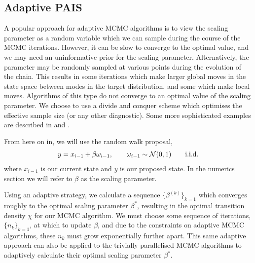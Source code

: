 \documentclass[final]{siamltex}
\begin{document}
\subsection{Adaptive PAIS}\label{sec:adapt}

A popular approach for adaptive MCMC algorithms is to view the scaling
parameter as a random variable which we can sample during the course
of the MCMC iterations. However, it can be slow to converge to the
optimal value, and we may need an
uninformative prior for the scaling parameter. Alternatively, the
parameter may be randomly sampled at various points during the
evolution of the chain. This results in some iterations which make
larger global moves in the state space between modes in the target
distribution, and some which make local moves. Algorithms of this type
do not converge to an optimal value of the scaling parameter. We choose to use a divide and conquer scheme which optimises the
effective sample size (or any other diagnostic). Some more
sophisticated examples are described in \cite{roberts2009examples} and
\cite{Ji2013adaptive}. 

From here on in, we will use the random walk proposal,
\begin{equation}y = x_{i-1}+\beta \omega_{i-1}, \qquad \omega_{i-1}
  \sim \mathcal{N}(0,1) \qquad {\rm i.i.d.}
\end{equation}
where $x_{i-1}$ is our current state and $y$ is our proposed state. In the numerics section we will refer to $\beta$ as the scaling parameter.

 Using an adaptive strategy, we calculate a sequence
 $\{\beta^{(k)}\}_{k=1}$ which converges roughly to the optimal
 scaling parameter $\beta^*$, resulting in the optimal transition
 density $\chi$ for our MCMC algorithm. We must choose some sequence
 of iterations, $\{n_k\}_{k=1}$, at which to update $\beta$, and due
 to the constraints on adaptive MCMC
 algorithms\cite{roberts2007coupling,roberts2009examples}, these $n_k$
 must grow exponentially further apart. This same adaptive approach
 can also be applied to the trivially parallelised MCMC algorithms to adaptively calculate their optimal scaling parameter $\beta^*$.
\end{document}
